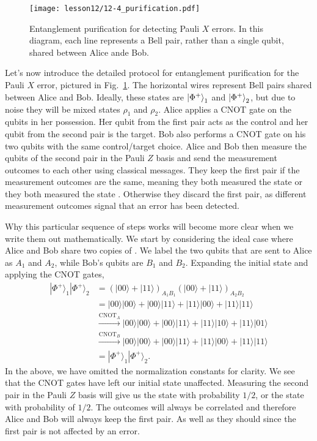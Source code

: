 \begin{figure}[t]
    \centering
    \texttt{[image: lesson12/12-4\_purification.pdf]}
    \caption[Entanglement purification for Pauli X errors]{Entanglement purification for detecting Pauli $X$ errors. In this diagram, each line represents a Bell pair, rather than a single qubit, shared between Alice ande Bob.}
    \label{fig:12-4_purification}
\end{figure}
Let's now introduce the detailed protocol for entanglement purification for the Pauli $X$ error, pictured in Fig.~\ref{fig:12-4_purification}.
The horizontal wires represent Bell pairs shared between Alice and Bob.
Ideally, these states are $\left| \Phi^+ \right\rangle_1$ and  $\left| \Phi^+ \right\rangle_2$, but due to noise they will be mixed states $\rho_1$ and $\rho_2$.
Alice applies a CNOT gate on the qubits in her possession.
Her qubit from the first pair acts as the control and her qubit from the second pair is the target.
Bob also performs a CNOT gate on his two qubits with the same control/target choice.
Alice and Bob then measure the qubits of the second pair in the Pauli $Z$ basis and send the measurement outcomes to each other using classical messages.
They keep the first pair if the measurement outcomes are the same, meaning they both measured the state  or they both measured the state .
Otherwise they discard the first pair, as different measurement outcomes signal that an error has been detected.

Why this particular sequence of steps works will become more clear when we write them out mathematically.
We start by considering the ideal case where Alice and Bob share two copies of \ket{\Phi^+}.
We label the two qubits that are sent to Alice as $A_1$ and $A_2$, while Bob's qubits are $B_1$ and $B_2$.
Expanding the initial state and applying the CNOT gates,
\begin{align}
    |\Phi^{+}\rangle_{1} |\Phi^{+}\rangle_{2} & = (|00\rangle + |11\rangle)_{A_1B_1} (|00\rangle + |11\rangle)_{A_2B_2} \nonumber\\
    & = |00\rangle |00\rangle + |00\rangle |11\rangle + |11\rangle |00\rangle +|11\rangle |11\rangle \nonumber\\
    & \stackrel{\mathrm{CNOT}_{A}}{\longrightarrow} |00\rangle|00\rangle+|00\rangle|11\rangle+|11\rangle|10\rangle+|11\rangle|01\rangle \\
    & \stackrel{\mathrm{CNOT}_{B}}{\longrightarrow} |00\rangle|00\rangle+|00\rangle|11\rangle+|11\rangle|00\rangle+|11\rangle|11\rangle \nonumber \\
    & = |\Phi^{+}\rangle_{1} |\Phi^{+}\rangle_{2} \nonumber.
    \label{eq:12-4_purification_ideal}
\end{align}
In the above, we have omitted the normalization constants for clarity.
We see that the CNOT gates have left our initial state unaffected.
Measuring the second pair in the Pauli $Z$ basis will give us the state  with probability $1/2$, or the state  with probability of $1/2$.
The outcomes will always be correlated and therefore Alice and Bob will always keep the first pair.
As well as they should since the first pair is not affected by an error.


